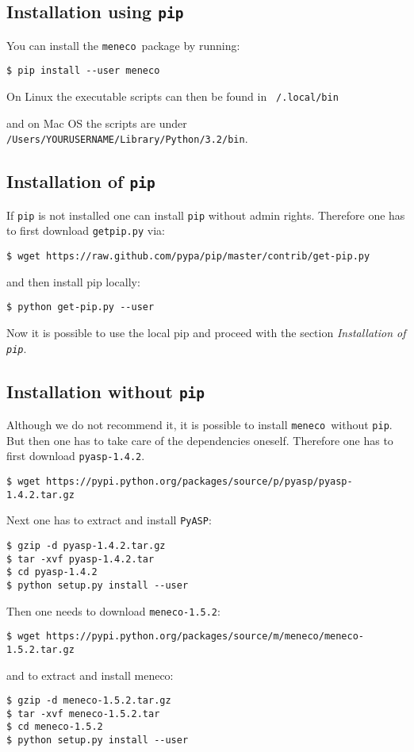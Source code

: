 \documentclass{article}
\newcommand\meneco{\texttt{meneco}}
\begin{document}
\subsection{Installation using \texttt{pip}}
You can install the \meneco\ package by running:

\begin{Verbatim}[frame=single]
$ pip install --user meneco
\end{Verbatim}


On Linux the executable scripts can then be found in \texttt{~/.local/bin}

and on Mac OS the scripts are under \texttt{/Users/YOURUSERNAME/Library/Python/3.2/bin}.


\subsection{Installation of \texttt{pip}}
If \texttt{pip} is not installed one can install \texttt{pip} without admin rights.
Therefore one has to first download \texttt{getpip.py} via:
\begin{Verbatim}[frame=single]
$ wget https://raw.github.com/pypa/pip/master/contrib/get-pip.py
\end{Verbatim}
and then install pip locally:
\begin{Verbatim}[frame=single]
$ python get-pip.py --user
\end{Verbatim}
Now it is possible to use the local pip and proceed with the section \emph{Installation of \texttt{pip}}.

\subsection{Installation without \texttt{pip}}
Although we do not recommend it, it is possible to install \meneco\ without \texttt{pip}.
But then one has to take care of the dependencies oneself.
Therefore one has to first download \texttt{pyasp-1.4.2}.

\begin{Verbatim}[frame=single]
$ wget https://pypi.python.org/packages/source/p/pyasp/pyasp-1.4.2.tar.gz
\end{Verbatim}
Next one has to extract and install \texttt{PyASP}:
\begin{Verbatim}[frame=single]
$ gzip -d pyasp-1.4.2.tar.gz
$ tar -xvf pyasp-1.4.2.tar
$ cd pyasp-1.4.2
$ python setup.py install --user
\end{Verbatim}
Then one needs to download \texttt{meneco-1.5.2}:
\begin{Verbatim}[frame=single]
$ wget https://pypi.python.org/packages/source/m/meneco/meneco-1.5.2.tar.gz
\end{Verbatim}
and to extract and install meneco:
\begin{Verbatim}[frame=single]
$ gzip -d meneco-1.5.2.tar.gz
$ tar -xvf meneco-1.5.2.tar
$ cd meneco-1.5.2
$ python setup.py install --user
\end{Verbatim}
\end{document}
